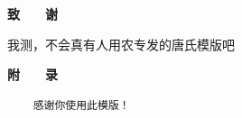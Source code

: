 \documentclass[UTF8,a4paper,12pt]{ctexart}
\begin{document}
	\newpage
	 
	\centerline{\textbf{\fontsize{16pt}{\baselineskip}\heiti 致　　谢}}
	\normalsize
	\vspace{0.4cm}
	我测，不会真有人用农专发的唐氏模版吧
	\newpage
	\pagestyle{empty}
	 
	\centerline{\textbf{\fontsize{16pt}{\baselineskip}\heiti 附　　录}}
	\begin{spacing}{1.1}
	\begin{verbatim}
	感谢你使用此模版！
		
	\end{verbatim}
	\end{spacing}
	
	
\end{document}
